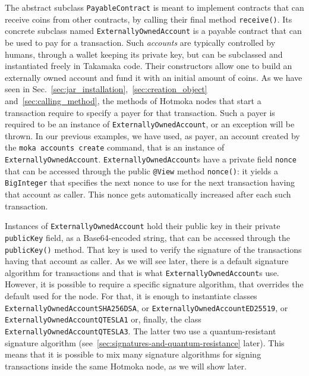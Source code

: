 The abstract subclass
\texttt{PayableContract}
is meant to implement contracts that
can receive coins from other contracts, by calling their final method
\texttt{receive()}. Its concrete subclass
named \texttt{ExternallyOwnedAccount} is
a payable contract that can be used to pay for a transaction.
Such \emph{accounts} are typically controlled by humans, through a wallet
keeping its private key, but can be
subclassed and instantiated freely in Takamaka code. Their constructors
allow one to build an externally owned account and fund it with an initial
amount of coins. As we have seen in
Sec.~\ref{sec:jar_installation},~\ref{sec:creation_object} and~\ref{sec:calling_method},
the methods of Hotmoka nodes that start a transaction require to specify a
payer
for that transaction. Such a payer is required to be an instance of
\texttt{ExternallyOwnedAccount},
or an exception will be thrown. In our previous examples,
we have used, as payer, an account created by the
\texttt{moka accounts create} command,
that is an instance of \texttt{ExternallyOwnedAccount}.
\texttt{ExternallyOwnedAccount}s have a private field \texttt{nonce} that can be accessed through
the public \texttt{@View} method \texttt{nonce()}:
it yields a \texttt{BigInteger}
that specifies the next nonce to use for the next transaction having that
account as caller. This nonce gets automatically increased after each such transaction.

Instances of \texttt{ExternallyOwnedAccount} hold their public key in their
private \texttt{publicKey} field, as a Base64-encoded string,
that can be accessed through the \texttt{publicKey()} method.
That key is used to verify the signature of the transactions
having that account as caller. As we will see later, there is a default signature
algorithm for transactions and that is what \texttt{ExternallyOwnedAccount}s use.
However, it is possible to require a specific signature algorithm, that overrides the default
used for the node. For that, it is enough to instantiate classes
\texttt{ExternallyOwnedAccountSHA256DSA},
or \texttt{ExternallyOwnedAccountED25519}, or \texttt{ExternallyOwnedAccountQTESLA1}
or, finally, the class \texttt{ExternallyOwnedAccountQTESLA3}. The latter two use a
quantum-resistant signature algorithm
(see~\ref{sec:signatures-and-quantum-resistance} later). This means that it is possible
to mix many signature algorithms for signing transactions inside the same Hotmoka node,
as we will show later.